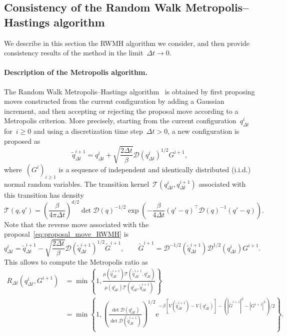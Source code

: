 \documentclass{article}
\renewcommand{\geq}{\geqslant}
\newcommand{\Diff}{\mathcal{D}}
\renewcommand{\dim}{d}
\begin{document}
\subsection{Consistency of the Random Walk Metropolis--Hastings algorithm}
\label{subsec:Donsker}

We describe in this section the RWMH algorithm we consider, and then provide consistency results of the method in the limit~$\Delta t \to 0$.

\paragraph{Description of the Metropolis algorithm.}
The Random Walk Metropolis--Hastings algorithm~\cite{metropolis,hastings} is obtained by first proposing moves constructed from the current configuration by adding a Gaussian increment, and then accepting or rejecting the proposal move according to a Metropolis criterion. More precisely, starting from the current configuration~$q^i_{\Delta t}$ for~$i \geq 0$ and using a discretization time step~$\Delta t>0$, a new configuration is proposed as 
\begin{equation}
  \label{eq:proposal_move_RWMH}
  \widetilde{q}^{i+1}_{\Delta t} = q^i_{\Delta t} + \sqrt{\frac{2\Delta t}{\beta}}\Diff(q^i_{\Delta t})^{1/2}G^{i+1},
\end{equation}
where~$(G^i)_{i\geq 1}$ is a sequence of independent and identically distributed (i.i.d.) normal random variables. The transition kernel~$\mathscr{T}(q^i_{\Delta t},q^{i+1}_{\Delta t})$ associated with this transition has density
\[
\mathscr{T}(q,q') = \left(\frac{\beta}{4\pi\Delta t}\right)^{\dim/2}\operatorname{det}\Diff(q)^{-1/2} \exp\left(-\frac{\beta}{4\Delta t} (q'-q)^\top \Diff(q)^{-1} (q'-q)\right).
\]
Note that the reverse move associated with the proposal~\eqref{eq:proposal_move_RWMH} is
\[
q^i_{\Delta t} = \widetilde{q}^{i+1}_{\Delta t} - \sqrt{\frac{2\Delta t}{\beta}}\Diff(\widetilde{q}^{i+1}_{\Delta t})^{1/2} \widetilde{G}^{i+1},
\qquad
\widetilde{G}^{i+1} = \Diff^{-1/2}(\widetilde q^{i+1}_{\Delta t})\Diff^{1/2}(q^i_{\Delta t})G^{i+1}.
\]
This allows to compute the Metropolis ratio as
\begin{equation}
  \label{eq:def_R_dt}
\begin{aligned}
  R_{\Delta t}(q^i_{\Delta t},G^{i+1}) & = \min\left\{ 1, \frac{\mu(\widetilde{q}^{i+1}_{\Delta t})\mathscr{T}(\widetilde{q}^{i+1}_{\Delta t},q^i_{\Delta t})}{\mu(q^i_{\Delta t})\mathscr{T}(q^i_{\Delta t},\widetilde{q}^{i+1}_{\Delta t})} \right\}\\
  & = \min\left\{1,\left(\frac{\operatorname{det} \Diff(q^i_{\Delta t})}{\operatorname{det} \Diff(\widetilde q^{i+1}_{\Delta t})}\right)^{1/2} \mathrm{e}^{- \beta [ V(\widetilde q^{i+1}_{\Delta t})-V(q^i_{\Delta t})] - (|\widetilde G^{i+1}|^2-|G^{i+1}|^2)/2} \right\}.
  \end{aligned}
\end{equation}
\end{document}
